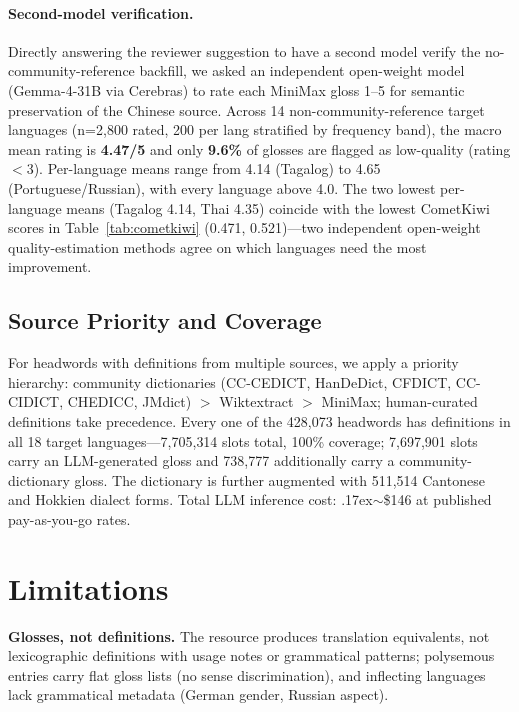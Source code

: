 \documentclass[11pt]{article}
\begin{document}
\paragraph{Second-model verification.} Directly answering the reviewer suggestion to have a second model verify the no-community-reference backfill, we asked an independent open-weight model (Gemma-4-31B via Cerebras) to rate each MiniMax gloss 1--5 for semantic preservation of the Chinese source. Across 14 non-community-reference target languages (n=2{,}800 rated, 200 per lang stratified by frequency band), the macro mean rating is \textbf{4.47/5} and only \textbf{9.6\%} of glosses are flagged as low-quality (rating $<$3). Per-language means range from 4.14 (Tagalog) to 4.65 (Portuguese/Russian), with every language above 4.0. The two lowest per-language means (Tagalog 4.14, Thai 4.35) coincide with the lowest CometKiwi scores in Table~\ref{tab:cometkiwi} (0.471, 0.521)---two independent open-weight quality-estimation methods agree on which languages need the most improvement.

\subsection{Source Priority and Coverage}

For headwords with definitions from multiple sources, we apply a priority hierarchy: community dictionaries (CC-CEDICT, HanDeDict, CFDICT, CC-CIDICT, CHEDICC, JMdict) $>$ Wiktextract $>$ MiniMax; human-curated definitions take precedence. Every one of the 428,073 headwords has definitions in all 18 target languages---7{,}705{,}314 slots total, 100\% coverage; 7{,}697{,}901 slots carry an LLM-generated gloss and 738{,}777 additionally carry a community-dictionary gloss. The dictionary is further augmented with 511{,}514 Cantonese and Hokkien dialect forms. Total LLM inference cost: {\raise.17ex\hbox{$\scriptstyle\sim$}}\$146 at published pay-as-you-go rates.


\section*{Limitations}
\label{sec:limitations}

\textbf{Glosses, not definitions.} The resource produces translation equivalents, not lexicographic definitions with usage notes or grammatical patterns; polysemous entries carry flat gloss lists (no sense discrimination), and inflecting languages lack grammatical metadata (German gender, Russian aspect).
\end{document}
